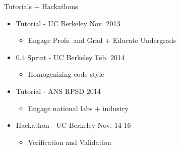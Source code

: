 \documentclass[xcolor=x11names,compress]{beamer}
\begin{document}
\begin{frame}{Tutorials + Hackathons}
  \Large
    \begin{itemize}
        \item Tutorial - UC Berkeley Nov. 2013
        \begin{itemize}
            \large
            \item Engage Profs. and Grad + Educate Undergrads
        \end{itemize}
        \item 0.4 Sprint - UC Berkeley Feb. 2014
        \begin{itemize}
            \large
            \item Homogenizing code style
        \end{itemize}
        \item Tutorial - ANS RPSD 2014
        \begin{itemize}
            \large
            \item Engage national labs + industry
        \end{itemize}
        \item Hackathon - UC Berkeley Nov. 14-16
        \begin{itemize}
            \large
            \item Verification and Validation
        \end{itemize}
    \end{itemize}
\end{frame}

\end{document}
